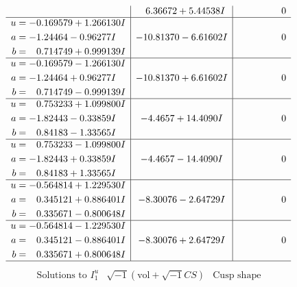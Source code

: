 \documentclass[1p]{elsarticle_modified}
\theoremstyle{definition}
\newcommand{\I}{\sqrt{-1}}
\begin{document}
$$\begin{array}{c|c|c}
 & \phantom{-}6.36672 + 5.44538 I & \phantom{-0.000000 } 0 \\ \hline\begin{aligned}
u &= -0.169579 + 1.266130 I \\
a &= -1.24464 - 0.96277 I \\
b &= \phantom{-}0.714749 + 0.999139 I\end{aligned}
 & -10.81370 - 6.61602 I & \phantom{-0.000000 } 0 \\ \hline\begin{aligned}
u &= -0.169579 - 1.266130 I \\
a &= -1.24464 + 0.96277 I \\
b &= \phantom{-}0.714749 - 0.999139 I\end{aligned}
 & -10.81370 + 6.61602 I & \phantom{-0.000000 } 0 \\ \hline\begin{aligned}
u &= \phantom{-}0.753233 + 1.099800 I \\
a &= -1.82443 - 0.33859 I \\
b &= \phantom{-}0.84183 - 1.33565 I\end{aligned}
 & -4.4657 + 14.4090 I & \phantom{-0.000000 } 0 \\ \hline\begin{aligned}
u &= \phantom{-}0.753233 - 1.099800 I \\
a &= -1.82443 + 0.33859 I \\
b &= \phantom{-}0.84183 + 1.33565 I\end{aligned}
 & -4.4657 - 14.4090 I & \phantom{-0.000000 } 0 \\ \hline\begin{aligned}
u &= -0.564814 + 1.229530 I \\
a &= \phantom{-}0.345121 + 0.886401 I \\
b &= \phantom{-}0.335671 - 0.800648 I\end{aligned}
 & -8.30076 - 2.64729 I & \phantom{-0.000000 } 0 \\ \hline\begin{aligned}
u &= -0.564814 - 1.229530 I \\
a &= \phantom{-}0.345121 - 0.886401 I \\
b &= \phantom{-}0.335671 + 0.800648 I\end{aligned}
 & -8.30076 + 2.64729 I & \phantom{-0.000000 } 0\\
 \hline 
 \end{array}$$\newpage$$\begin{array}{c|c|c}  
\text{Solutions to }I^u_{1}& \I (\text{vol} + \sqrt{-1}CS) & \text{Cusp shape}\\

\end{array}$$
\end{document}
